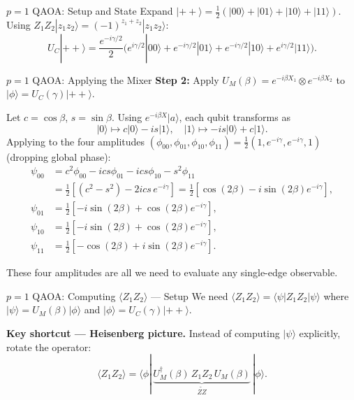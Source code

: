 \documentclass{beamer}
\begin{document}
\begin{frame}
\begin{frame}{$p=1$ QAOA: Setup and State}
Expand $|{++}\rangle = \tfrac{1}{2}(|00\rangle+|01\rangle+|10\rangle+|11\rangle)$.
Using $Z_1Z_2|z_1z_2\rangle = (-1)^{z_1+z_2}|z_1z_2\rangle$:
\[
U_C|{++}\rangle = \frac{e^{-i\gamma/2}}{2}
\bigl(e^{i\gamma/2}|00\rangle + e^{-i\gamma/2}|01\rangle
+e^{-i\gamma/2}|10\rangle + e^{i\gamma/2}|11\rangle\bigr).
\]
\end{frame}


\begin{frame}{$p=1$ QAOA: Applying the Mixer}
\textbf{Step 2:} Apply $U_M(\beta) = e^{-i\beta X_1}\otimes e^{-i\beta X_2}$
to $|\phi\rangle = U_C(\gamma)|{++}\rangle$.

Let $c=\cos\beta$, $s=\sin\beta$.  Using
$e^{-i\beta X}|a\rangle$, each qubit transforms as
\[
|0\rangle\mapsto c|0\rangle-is|1\rangle,\quad
|1\rangle\mapsto -is|0\rangle+c|1\rangle.
\]
Applying to the four amplitudes $(\phi_{00},\phi_{01},\phi_{10},\phi_{11})
= \tfrac{1}{2}(1,e^{-i\gamma},e^{-i\gamma},1)$ (dropping global phase):
\begin{align*}
\psi_{00} &= c^2\phi_{00} - ics\phi_{01} - ics\phi_{10} - s^2\phi_{11}\\
          &= \tfrac{1}{2}[(c^2-s^2) - 2ics\,e^{-i\gamma}]
           = \tfrac{1}{2}[\cos(2\beta) - i\sin(2\beta)e^{-i\gamma}],\\
\psi_{01} &= \tfrac{1}{2}[-i\sin(2\beta) + \cos(2\beta)e^{-i\gamma}],\\
\psi_{10} &= \tfrac{1}{2}[-i\sin(2\beta) + \cos(2\beta)e^{-i\gamma}],\\
\psi_{11} &= \tfrac{1}{2}[-\cos(2\beta) + i\sin(2\beta)e^{-i\gamma}].
\end{align*}

These four amplitudes are all we need to evaluate any single-edge observable.
\end{frame}


\begin{frame}{$p=1$ QAOA: Computing $\langle Z_1Z_2\rangle$ — Setup}
We need $\langle Z_1Z_2\rangle
= \langle\psi|Z_1Z_2|\psi\rangle$ where
$|\psi\rangle = U_M(\beta)|\phi\rangle$ and $|\phi\rangle = U_C(\gamma)|{++}\rangle$.

\medskip
\textbf{Key shortcut — Heisenberg picture.}  Instead of computing $|\psi\rangle$ explicitly,
rotate the operator:
\[
\langle Z_1Z_2\rangle
= \langle\phi|\,\underbrace{U_M^\dagger(\beta)\,Z_1Z_2\,U_M(\beta)}_{\widetilde{ZZ}}\,|\phi\rangle.
\]


\end{frame}
\end{frame}
\end{document}
